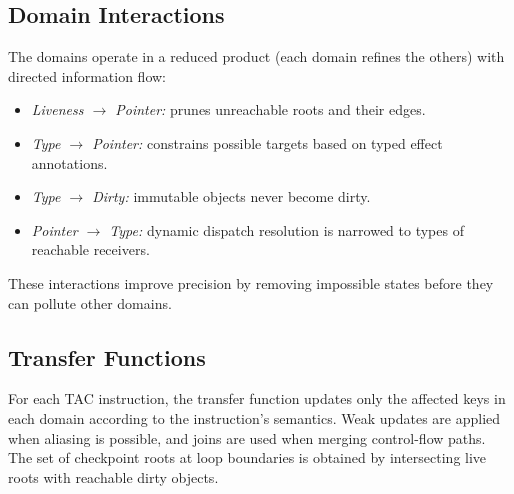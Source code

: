 \subsection{Domain Interactions}
The domains operate in a reduced product (each domain refines the others) with directed information flow:
\begin{itemize}
    \item \emph{Liveness $\rightarrow$ Pointer:} prunes unreachable roots and their edges.
    \item \emph{Type $\rightarrow$ Pointer:} constrains possible targets based on typed effect annotations.
    \item \emph{Type $\rightarrow$ Dirty:} immutable objects never become dirty.
    \item \emph{Pointer $\rightarrow$ Type:} dynamic dispatch resolution is narrowed to types of reachable receivers.
\end{itemize}
These interactions improve precision by removing impossible states before they can pollute other domains.

\subsection{Transfer Functions}
For each TAC instruction, the transfer function updates only the affected keys in each domain according to the instruction’s semantics.
Weak updates are applied when aliasing is possible, and joins are used when merging control-flow paths.
The set of checkpoint roots at loop boundaries is obtained by intersecting live roots with reachable dirty objects.

